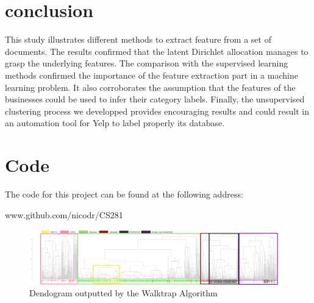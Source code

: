 \documentclass[twoside]{article}
\begin{document}
\begin{multicols}{2}
\section{conclusion}

This study illustrates different methods to extract feature from a set of documents. The results confirmed that the latent Dirichlet allocation manages to grasp the underlying features. The comparison with the supervised learning methods confirmed the importance of the feature extraction part in a machine learning problem. It also corroborates the assumption that the features of the businesses could be used to infer their category labels. Finally, the unsupervised clustering process we developped provides encouraging results and could result in an automation tool for Yelp to label properly its database. 

\section*{Code}

The code for this project can be found at the following address:

\begin{center}
www.github.com/nicodr/CS281
\end{center}



\nocite{*} %


\end{multicols}

\newpage

\begin{figure}
\centering
\includegraphics[angle=90,width=0.25\linewidth]{img/den_ovi2-1.png}
\caption{Dendogram outputted by the Walktrap Algorithm}
\end{figure}
\end{document}
